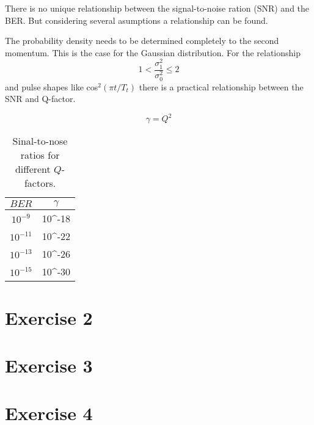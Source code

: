 There is no unique relationship between the signal-to-noise ration (SNR) and the BER. But considering several asumptions a relationship can be found. 

The probability density needs to be determined completely to the second momentum. This is the case for the Gaussian distribution. For the relationship 
\begin{equation}
1 < \frac{\sigma_1^2}{\sigma_0^2}\leq 2
\label{eq:}
\end{equation}
and pulse shapes like cos$^2(\pi t/T_t)$ there is a practical relationship between the SNR and Q-factor.

\begin{equation}
\gamma = Q^2
\label{eq:}
\end{equation}

\begin{table}[h]%
\centering
\caption{Sinal-to-nose ratios for different $Q$-factors.}
 
\begin{tabular}{cc}

\toprule

$BER$	& $\gamma$\\
\midrule
$10^{-9}$ &10^{-18} \\
$10^{-11}$ &10^{-22} \\
$10^{-13}$ &10^{-26} \\
$10^{-15}$ &10^{-30} \\
\bottomrule 
\end{tabular}
\label{tab:1_daempfung}
\end{table}


\section{Exercise 2}




\section{Exercise 3}



\section{Exercise 4}